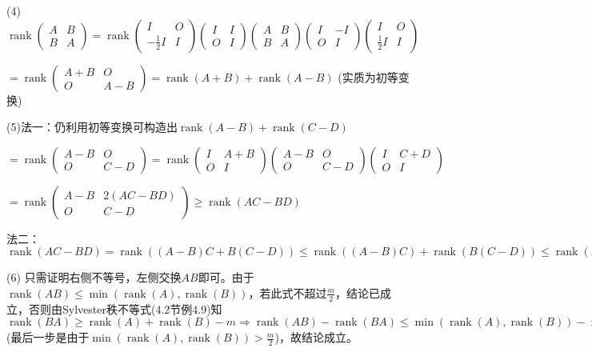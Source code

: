 \documentclass[a4paper,UTF8,fontset=windows]{ctexart}
\DeclareMathOperator{\rank}{rank}
\begin{document}
\begin{enumerate}
(4) $\rank\begin{pmatrix}A&B\\B&A\end{pmatrix}=\rank\begin{pmatrix}I&O\\-\frac{1}{2}I&I\end{pmatrix}\begin{pmatrix}I&I\\O&I\end{pmatrix}\begin{pmatrix}A&B\\B&A\end{pmatrix}\begin{pmatrix}I&-I\\O&I\end{pmatrix}\begin{pmatrix}I&O\\\frac{1}{2}I&I\end{pmatrix}$

$=\rank\begin{pmatrix}A+B&O\\O&A-B\end{pmatrix}=\rank(A+B)+\rank(A-B)$ (实质为初等变换)

(5)法一：仍利用初等变换可构造出$\rank(A-B)+\rank(C-D)$

$=\rank\begin{pmatrix}A-B&O\\O&C-D\end{pmatrix}=\rank\begin{pmatrix}I&A+B\\O&I\end{pmatrix}\begin{pmatrix}A-B&O\\O&C-D\end{pmatrix}\begin{pmatrix}I&C+D\\O&I\end{pmatrix}$

$=\rank\begin{pmatrix}A-B&2(AC-BD)\\O&C-D\end{pmatrix}\ge\rank(AC-BD)$

法二：$\rank(AC-BD)=\rank((A-B)C+B(C-D))\le\rank((A-B)C)+\rank(B(C-D))\le\rank(A-B)+\rank(C-D)$

(6) 只需证明右侧不等号，左侧交换$AB$即可。由于$\rank(AB)\le\min(\rank(A),\rank(B))$，若此式不超过$\frac{m}{2}$，结论已成立，否则由Sylvester秩不等式(4.2节例4.9)知$\rank(BA)\ge \rank(A)+\rank(B)-m\Rightarrow\rank(AB)-\rank(BA)\le\min(\rank(A),\rank(B))-\rank(A)-\rank(B)+m\le m-\rank(A)\le\frac{m}{2}$ (最后一步是由于$\min(\rank(A),\rank(B))>\frac{m}{2}$)，故结论成立。


\end{enumerate}
\end{document}
